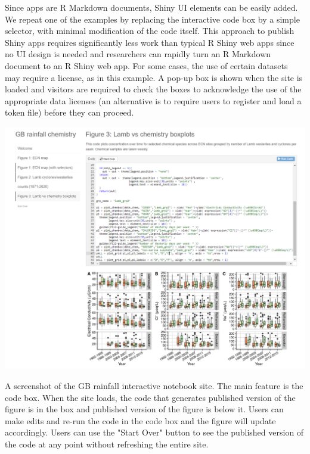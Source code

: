 Since  apps are R Markdown documents, Shiny UI elements
can be easily added. We repeat one of the examples by replacing the
interactive code box by a simple selector, with minimal modification of
the code itself. This approach to publish Shiny apps requires
significantly less work than typical R Shiny web apps since no UI design
is needed and researchers can rapidly turn an R Markdown document to an R
Shiny web app. For some cases, the use of certain datasets may require a
license, as in this example. A pop-up box is shown when the site is
loaded and visitors are required to check the boxes to acknowledge the
use of the appropriate data licenses (an alternative is to require
users to register and load a token file) before they can proceed.

\begin{Schunk}
\begin{widefigure}
\includegraphics[width=\textwidth]{GB_notebook_screenshot} \caption[A screenshot of the GB rainfall interactive notebook site]{A screenshot of the GB rainfall interactive notebook site. The main feature is the code box. When the site loads, the code that generates published version of the figure is in the box and published version of the figure is below it. Users can make edits and re-run the code in the code box and the figure will update accordingly. Users can use the "Start Over" button to see the published version of the code at any point without refreshing the entire site.}\label{fig:fig2}
\end{widefigure}
\end{Schunk}

